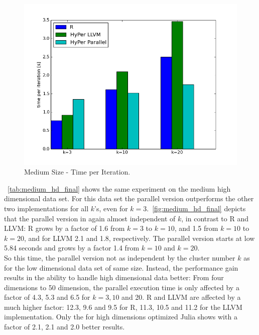 \begin{figure}[htsb]
  \centering
  \includegraphics[scale=0.4, trim="0cm 1.5cm 0cm 0cm"]{figures/charts/final_15M}
  \caption[Medium Size - Time per Iteration]{Medium Size - Time per Iteration.}
  \label{fig:final_15M}
\end{figure}

~\autoref{tab:medium_hd_final} shows the same experiment on the medium high dimensional data set. For this data set the parallel version outperforms the other two implementations for all $k$'s, even for $k = 3$.~\autoref{fig:medium_hd_final} depicts that the parallel version in again almost independent of $k$, in contrast to R and LLVM: R grows by a factor of 1.6 from $k = 3$ to $k = 10$, and 1.5 from $k = 10$ to $k = 20$, and for LLVM 2.1 and 1.8, respectively. The parallel version starts at low 5.84 seconds and grows by a factor 1.4 from $k = 10$ and $k = 20$. 
\\
So this time, the parallel version not as independent by the cluster number $k$ as for the low dimensional data set of same size. Instead, the performance gain results in the ability to handle high dimensional data better: From four dimensions to 50 dimension, the parallel execution time is only affected by a factor of 4.3, 5.3 and 6.5 for $k = 3, 10$ and 20. R and LLVM are affected by a much higher factor: 12.3, 9.6 and 9.5 for R, 11.3, 10.5 and 11.2 for the LLVM implementation. Only the for high dimensions optimized Julia shows with a factor of 2.1, 2.1 and 2.0 better results.


